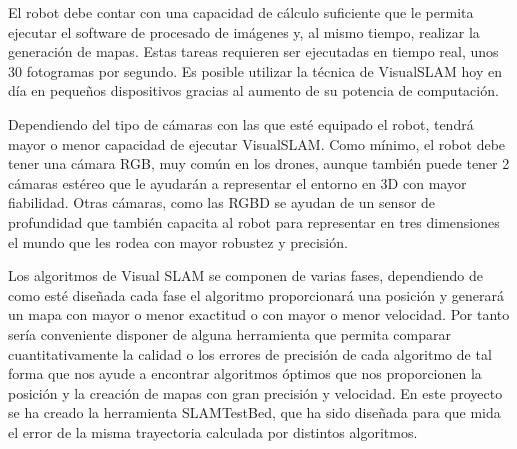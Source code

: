 El robot debe contar con una capacidad de cálculo suficiente que le permita ejecutar el software de procesado de imágenes y, al mismo tiempo, realizar la generación de mapas. Estas tareas requieren ser ejecutadas en tiempo real, unos 30 fotogramas por segundo. Es posible utilizar la técnica de VisualSLAM hoy en día en pequeños dispositivos gracias al aumento de su potencia de computación.

Dependiendo del tipo de cámaras con las que esté equipado  el robot,  tendrá mayor o menor capacidad de ejecutar VisualSLAM. Como mínimo, el robot debe tener una cámara RGB, muy común en los drones, aunque también puede tener 2 cámaras estéreo que le ayudarán a representar el entorno en 3D con mayor fiabilidad. Otras cámaras,  como las RGBD se ayudan de un sensor de profundidad que también capacita al robot para representar en tres dimensiones el mundo que les rodea con mayor robustez y precisión.

Los algoritmos de Visual SLAM se componen de varias fases, dependiendo de como esté diseñada cada fase el algoritmo proporcionará una posición y generará un mapa con mayor o menor exactitud o con mayor o menor velocidad. Por tanto sería conveniente disponer de alguna herramienta que permita comparar cuantitativamente la calidad o los errores de precisión de cada algoritmo de tal forma que nos ayude a encontrar algoritmos óptimos que nos proporcionen la posición y la creación de mapas con gran precisión y velocidad. En este proyecto se ha creado la herramienta SLAMTestBed, que ha sido diseñada para que mida el error de la misma trayectoria calculada por distintos algoritmos.